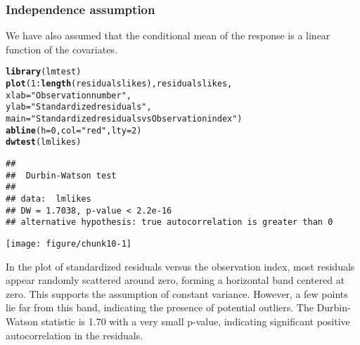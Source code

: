 \documentclass[11pt]{article}\usepackage[]{graphicx}\usepackage[]{xcolor}
\makeatletter
\newcommand{\hlnum}[1]{\textcolor[rgb]{0.686,0.059,0.569}{#1}}%
\newcommand{\hlsng}[1]{\textcolor[rgb]{0.192,0.494,0.8}{#1}}%
\newcommand{\hlopt}[1]{\textcolor[rgb]{0,0,0}{#1}}%
\newcommand{\hldef}[1]{\textcolor[rgb]{0.345,0.345,0.345}{#1}}%
\newcommand{\hlkwc}[1]{\textcolor[rgb]{0.333,0.667,0.333}{#1}}%
\newcommand{\hlkwd}[1]{\textcolor[rgb]{0.737,0.353,0.396}{\textbf{#1}}}%
\newenvironment{kframe}{%
 \def\at@end@of@kframe{}%
 \ifinner\ifhmode%
  \def\at@end@of@kframe{\end{minipage}}%
  \begin{minipage}{\columnwidth}%
 \fi\fi%
 \def\FrameCommand##1{\hskip\@totalleftmargin \hskip-\fboxsep
 \colorbox{shadecolor}{##1}\hskip-\fboxsep
     \hskip-\linewidth \hskip-\@totalleftmargin \hskip\columnwidth}%
 \MakeFramed {\advance\hsize-\width
   \@totalleftmargin\z@ \linewidth\hsize
   \@setminipage}}%
 {\par\unskip\endMakeFramed%
 \at@end@of@kframe}
\newenvironment{knitrout}{}{} %
\makeatother
\begin{document}
\subsubsection{Independence assumption}
We have also assumed that the conditional mean of the response is a linear function of the covariates.
\begin{knitrout}
\color{fgcolor}\begin{kframe}
\begin{alltt}
\hlkwd{library}\hldef{(lmtest)}
\hlkwd{plot}\hldef{(}\hlnum{1}\hlopt{:}\hlkwd{length}\hldef{(residualslikes), residualslikes,}
     \hlkwc{xlab} \hldef{=} \hlsng{"Observation number"}\hldef{,}
     \hlkwc{ylab} \hldef{=} \hlsng{"Standardized residuals"}\hldef{,}
     \hlkwc{main} \hldef{=} \hlsng{"Standardized residuals vs Observation index"}\hldef{)}
\hlkwd{abline}\hldef{(}\hlkwc{h} \hldef{=} \hlnum{0}\hldef{,} \hlkwc{col} \hldef{=} \hlsng{"red"}\hldef{,} \hlkwc{lty} \hldef{=} \hlnum{2}\hldef{)}
\hlkwd{dwtest}\hldef{(lmlikes)}
\end{alltt}
\begin{verbatim}
## 
## 	Durbin-Watson test
## 
## data:  lmlikes
## DW = 1.7038, p-value < 2.2e-16
## alternative hypothesis: true autocorrelation is greater than 0
\end{verbatim}
\end{kframe}

{\centering \texttt{[image: figure/chunk10-1]} 

}


\end{knitrout}
In the plot of standardized residuals versus the observation index, most residuals appear randomly scattered around zero, forming a horizontal band centered at zero. This supports the assumption of constant variance. However, a few points lie far from this band, indicating the presence of potential outliers. The Durbin-Watson statistic is 1.70 with a very small p-value, indicating significant positive autocorrelation in the residuals.
\end{document}
